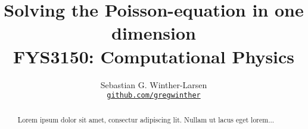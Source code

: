 \documentclass[10pt, a4paper]{amsart}
\title{Solving the Poisson-equation in one dimension \\
  \hrulefill\small{ FYS3150: Computational Physics }\hrulefill}
\author[Sebastian G. Winther-Larsen]{Sebastian G. Winther-Larsen \\
  \href{https://github.com/gregwinther/FYS3150/Project1}{\texttt{github.com/gregwinther}}}
\begin{document}
\begin{titlepage}
\begin{abstract}
Lorem ipsum dolor sit amet, consectur adipiscing lit. Nullam ut lacus eget lorem...
\end{abstract}
\maketitle
\tableofcontents
\end{titlepage}
\end{document}
